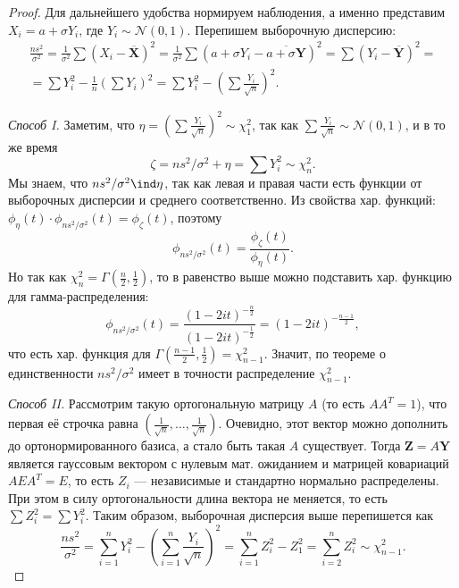 \begin{proof}
    Для дальнейшего удобства нормируем наблюдения, а именно представим $X_i = a + \sigma Y_i$, где $Y_i \sim \mathcal{N}(0, 1)$. Перепишем выборочную дисперсию:
    \begin{gather*}
        \frac{ns^2}{\sigma^2} = \frac{1}{\sigma^2}\sum \left(X_i - \overline{\mathbf X}\right)^2 = \frac{1}{\sigma^2}\sum \left(a+\sigma Y_i - \overline{a + \sigma \mathbf Y}\right)^2 = \sum \left(Y_i - \overline{\mathbf Y}\right)^2 =\\
    =\sum Y_i^2 - \frac{1}{n}\left(\sum Y_i\right)^2 = \sum Y_i^2 - \left(\sum \frac{Y_i}{\sqrt{n}}\right)^2.
    \end{gather*}
    
    \textit{Способ I.} Заметим, что $\eta = \left(\sum \frac{Y_i}{\sqrt{n}}\right)^2 \sim \chi^2_1$, так как $\sum \frac{Y_i}{\sqrt{n}} \sim \mathcal{N}(0, 1)$, и в то же время
    $$\zeta = ns^2/\sigma^2 + \eta = \sum Y_i^2 \sim \chi^2_n.$$
    Мы знаем, что $ns^2/\sigma^2 \ind \eta$, так как левая и правая части есть функции от выборочных дисперсии и среднего соответственно. Из свойства хар. функций: $\phi_{\eta}(t)\cdot \phi_{ns^2/\sigma^2}(t) = \phi_{\zeta}(t)$, поэтому
    $$\phi_{ns^2/\sigma^2}(t) = \frac{\phi_{\zeta}(t)}{\phi_{\eta}(t)}.$$
    Но так как $\chi^2_n = \Gamma\left(\frac{n}{2}, \frac{1}{2}\right)$, то в равенство выше можно подставить хар. функцию для гамма-распределения:
        \[
        \phi_{ns^2/\sigma^2}(t) = \frac{\left(1 - 2it\right)^{-\frac{n}{2}}}{\left(1 - 2it\right)^{-\frac{1}{2}}} = \left(1 - 2it\right)^{-\frac{n-1}{2}},
        \]
        что есть хар. функция для $\Gamma\left(\frac{n-1}{2}, \frac{1}{2}\right) = \chi^2_{n-1}$. Значит, по теореме о единственности $ns^2/\sigma^2$ имеет в точности распределение $\chi^2_{n-1}$.
    
    \textit{Способ II.} Рассмотрим такую ортогональную матрицу $A$ (то есть $AA^T=1$), что первая её строчка равна $(\frac{1}{\sqrt{n}}, \ldots, \frac{1}{\sqrt{n}})$. Очевидно, этот вектор можно дополнить до ортонормированного базиса, а стало быть такая $A$ существует. Тогда $\mathbf Z = A\mathbf Y$ является гауссовым вектором с нулевым мат. ожиданием и матрицей ковариаций $AEA^T=E$, то есть $Z_i$ --- независимые и стандартно нормально распределены. При этом в силу ортогональности длина вектора не меняется, то есть $\sum Z_i^2 = \sum Y_i^2$. Таким образом, выборочная дисперсия выше перепишется как
    \[
    \frac{ns^2}{\sigma^2} = \sum_{i=1}^n Y_i^2 - \left(\sum_{i=1}^n \frac{Y_i}{\sqrt{n}}\right)^2 = \sum_{i=1}^n Z_i^2 - Z_1^2 = \sum_{i=2}^{n} Z_i^2 \sim \chi^2_{n-1}.
    \]
\end{proof}

